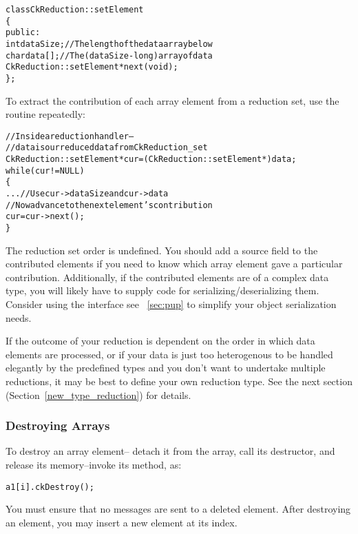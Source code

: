 \begin{alltt}
class CkReduction::setElement 
\{
public:
  int dataSize;//The length of the data array below
  char data[];//The (dataSize-long) array of data
  CkReduction::setElement *next(void);
\};
\end{alltt}

To extract the contribution of each array element from a reduction set, use the
 routine repeatedly:

\begin{alltt}
  //Inside a reduction handler-- 
  //  data is our reduced data from CkReduction_set
  CkReduction::setElement *cur=(CkReduction::setElement *)data;
  while (cur!=NULL)
  \{
    ... //Use cur->dataSize and cur->data
    //Now advance to the next element's contribution
    cur=cur->next();
  \}
\end{alltt}

The reduction set order is undefined.  You should add a source field to the
contributed elements if you need to know which array element gave a particular
contribution.  Additionally, if the contributed elements are of a complex 
data type, you will likely have to supply code for 
serializing/deserializing them.
Consider using the 
interface see ~\ref{sec:pup} to simplify your object serialization
needs.

If the outcome of your reduction is dependent on the order in which 
data elements are processed, or if your data is just too
heterogenous to be handled elegantly by the predefined types and you
don't want to undertake multiple reductions, it may be best to define
your own reduction type.  See the next section
(Section~\ref{new_type_reduction}) for details.

\subsubsection{Destroying Arrays}

To destroy an array element-- detach it from the array,
call its destructor, and release its memory--invoke its 
 method, as:

\begin{alltt}
a1[i].ckDestroy();
\end{alltt}

You must ensure that no messages are sent to a deleted element. 
After destroying an element, you may insert a new element at
its index.
